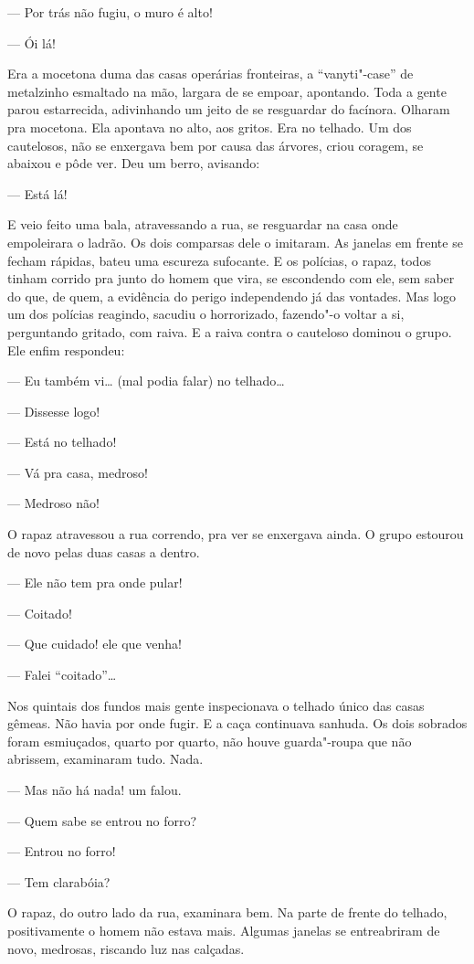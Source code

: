 \begin{linenumbers}
--- Por trás não fugiu, o muro é alto!

--- Ói lá!

Era a mocetona duma das casas operárias fronteiras, a ``vanyti"-case'' de
metalzinho esmaltado na mão, largara de se empoar, apontando. Toda a
gente parou estarrecida, adivinhando um jeito de se resguardar do
facínora. Olharam pra mocetona. Ela apontava no alto, aos gritos. Era no
telhado. Um dos cautelosos, não se enxergava bem por causa das árvores,
criou coragem, se abaixou e pôde ver. Deu um berro, avisando:

--- Está lá!

E veio feito uma bala, atravessando a rua, se resguardar na casa onde
empoleirara o ladrão. Os dois comparsas dele o imitaram. As janelas em
frente se fecham rápidas, bateu uma escureza sufocante. E os polícias, o
rapaz, todos tinham corrido pra junto do homem que vira, se escondendo
com ele, sem saber do que, de quem, a evidência do perigo independendo
já das vontades. Mas logo um dos polícias reagindo, sacudiu o
horrorizado, fazendo"-o voltar a si, perguntando gritado, com raiva. E a
raiva contra o cauteloso dominou o grupo. Ele enfim respondeu:

--- Eu também vi\ldots{} (mal podia falar) no telhado\ldots{}

--- Dissesse logo!

--- Está no telhado!

--- Vá pra casa, medroso!

--- Medroso não!

O rapaz atravessou a rua correndo, pra ver se enxergava ainda. O grupo
estourou de novo pelas duas casas a dentro.

--- Ele não tem pra onde pular!

--- Coitado!

--- Que cuidado! ele que venha!

--- Falei ``coitado''\ldots{}

Nos quintais dos fundos mais gente inspecionava o telhado único das
casas gêmeas. Não havia por onde fugir. E a caça continuava sanhuda. Os
dois sobrados foram esmiuçados, quarto por quarto, não houve
guarda"-roupa que não abrissem, examinaram tudo. Nada.

--- Mas não há nada! um falou.

--- Quem sabe se entrou no forro?

--- Entrou no forro!

--- Tem clarabóia?

O rapaz, do outro lado da rua, examinara bem. Na parte de frente do
telhado, positivamente o homem não estava mais. Algumas janelas se
entreabriram de novo, medrosas, riscando luz nas calçadas.


\end{linenumbers}
